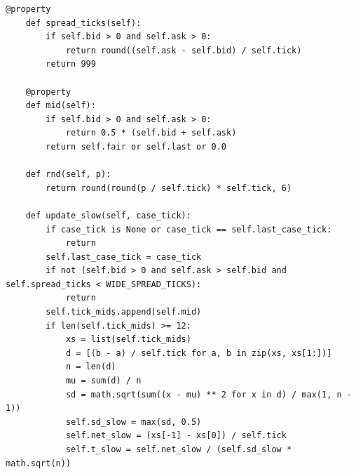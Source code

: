 \begin{lstlisting}[style=algocode]
    @property
    def spread_ticks(self):
        if self.bid > 0 and self.ask > 0:
            return round((self.ask - self.bid) / self.tick)
        return 999

    @property
    def mid(self):
        if self.bid > 0 and self.ask > 0:
            return 0.5 * (self.bid + self.ask)
        return self.fair or self.last or 0.0

    def rnd(self, p):
        return round(round(p / self.tick) * self.tick, 6)

    def update_slow(self, case_tick):
        if case_tick is None or case_tick == self.last_case_tick:
            return
        self.last_case_tick = case_tick
        if not (self.bid > 0 and self.ask > self.bid and self.spread_ticks < WIDE_SPREAD_TICKS):
            return
        self.tick_mids.append(self.mid)
        if len(self.tick_mids) >= 12:
            xs = list(self.tick_mids)
            d = [(b - a) / self.tick for a, b in zip(xs, xs[1:])]
            n = len(d)
            mu = sum(d) / n
            sd = math.sqrt(sum((x - mu) ** 2 for x in d) / max(1, n - 1))
            self.sd_slow = max(sd, 0.5)
            self.net_slow = (xs[-1] - xs[0]) / self.tick
            self.t_slow = self.net_slow / (self.sd_slow * math.sqrt(n))


\end{lstlisting}
